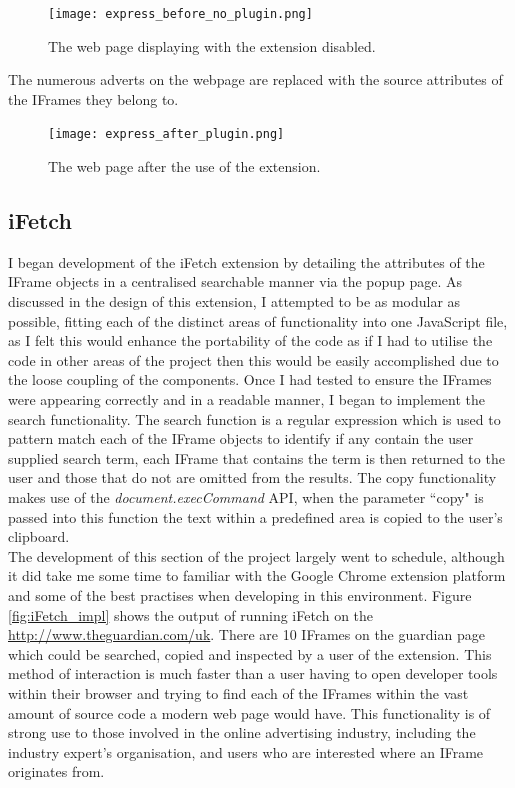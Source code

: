 \documentclass[12pt]{article}
\begin{document}
\begin{figure}[H]
    \centering
    \texttt{[image: express\_before\_no\_plugin.png]}
    \caption{The web page displaying with the extension disabled.}
    \label{fig:express_before_no_plugin}
\end{figure}

The numerous adverts on the webpage are replaced with the source attributes of the IFrames they belong to.

\begin{figure}[H]
    \centering
    \texttt{[image: express\_after\_plugin.png]}
    \caption{The web page after the use of the extension.}
    \label{fig:express_after_plugin}
\end{figure}

\subsection{iFetch}
I began development of the iFetch extension by detailing the attributes of the IFrame objects in a centralised searchable manner via the popup page. As discussed in the design of this extension, I attempted to be as modular as possible, fitting each of the distinct areas of functionality into one JavaScript file, as I felt this would enhance the portability of the code as if I had to utilise the code in other areas of the project then this would be easily accomplished due to the loose coupling of the components. Once I had tested to ensure the IFrames were appearing correctly and in a readable manner, I began to implement the search functionality. The search function is a regular expression which is used to pattern match each of the IFrame objects to identify if any contain the user supplied search term, each IFrame that contains the term is then returned to the user and those that do not are omitted from the results. The copy functionality makes use of the \textit{document.execCommand} API, when the parameter ``copy" is passed into this function the text within a predefined area is copied to the user's clipboard. \\

The development of this section of the project largely went to schedule, although it did take me some time to familiar with the Google Chrome extension platform and some of the best practises when developing in this environment. Figure \ref{fig:iFetch_impl} shows the output of running iFetch on the \url{http://www.theguardian.com/uk}. There are 10 IFrames on the guardian page which could be searched, copied and inspected by a user of the extension. This method of interaction is much faster than a user having to open developer tools within their browser and trying to find each of the IFrames within the vast amount of source code a modern web page would have. This functionality is of strong use to those involved in the online advertising industry, including the industry expert's organisation, and users who are interested where an IFrame originates from.     
\end{document}
